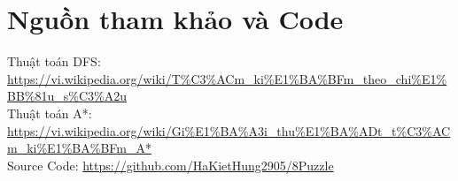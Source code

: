 \chapter{Nguồn tham khảo và Code} 
Thuật toán DFS: \url{https://vi.wikipedia.org/wiki/T%C3%ACm_ki%E1%BA%BFm_theo_chi%E1%BB%81u_s%C3%A2u} \\
Thuật toán A*: \url{https://vi.wikipedia.org/wiki/Gi%E1%BA%A3i_thu%E1%BA%ADt_t%C3%ACm_ki%E1%BA%BFm_A*} \\
 Source Code: \url{https://github.com/HaKietHung2905/8Puzzle}